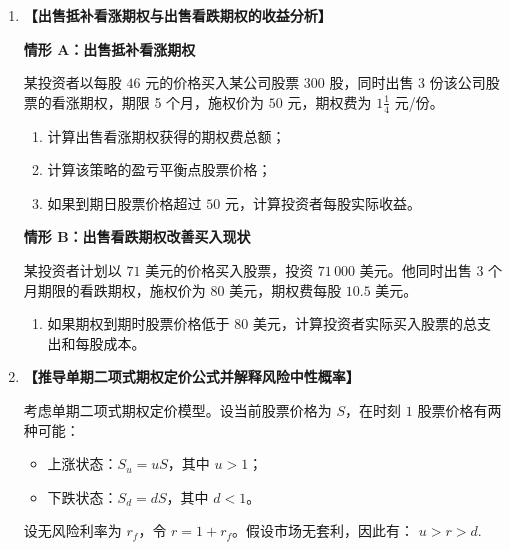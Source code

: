 \documentclass[10pt]{article}
\begin{document}
\begin{enumerate}[label=\textbf{\arabic*.}]
\vspace{0cm}

\item  {\bf{【出售抵补看涨期权与出售看跌期权的收益分析】}} %

\textbf{情形 A：出售抵补看涨期权}

某投资者以每股 \(46\) 元的价格买入某公司股票 300 股，同时出售 3 份该公司股票的看涨期权，期限 5 个月，施权价为 \(50\) 元，期权费为 \(1\frac{1}{4}\) 元/份。

\begin{enumerate}[label=(\arabic*)]
    \item 计算出售看涨期权获得的期权费总额；
    \item 计算该策略的盈亏平衡点股票价格；
    \item 如果到期日股票价格超过 \(50\) 元，计算投资者每股实际收益。
\end{enumerate}

\textbf{情形 B：出售看跌期权改善买入现状}

某投资者计划以 \(71\) 美元的价格买入股票，投资 \(71\,000\) 美元。他同时出售 3 个月期限的看跌期权，施权价为 \(80\) 美元，期权费每股 \(10.5\) 美元。

\begin{enumerate}[label=(\arabic*),start=4]
    \item 如果期权到期时股票价格低于 \(80\) 美元，计算投资者实际买入股票的总支出和每股成本。
\end{enumerate}

\vspace{0cm}


\item  {\bf{【推导单期二项式期权定价公式并解释风险中性概率】}} %

考虑单期二项式期权定价模型。设当前股票价格为 \(S\)，在时刻 \(1\) 股票价格有两种可能：

\begin{itemize}
    \item 上涨状态：\(S_u = uS\)，其中 \(u > 1\)；
    \item 下跌状态：\(S_d = dS\)，其中 \(d < 1\)。
\end{itemize}

设无风险利率为 \(r_f\)，令 \(r = 1 + r_f\)。假设市场无套利，因此有：
\(
u > r > d. 
\)


\end{enumerate}
\end{document}
